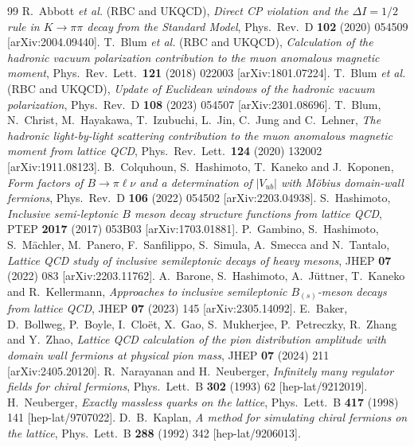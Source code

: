 \documentclass[11pt,a4paper]{article}
\numberwithin{equation}{section}
\begin{document}
\begin{thebibliography}{99}
 R.~Abbott \emph{et al.} (RBC and UKQCD), \emph{Direct CP violation and the $\Delta I=1/2$ rule in $K\to\pi\pi$ decay from the Standard Model}, Phys.\ Rev.\ D \textbf{102} (2020) 054509 [arXiv:2004.09440].
 T.~Blum \emph{et al.} (RBC and UKQCD), \emph{Calculation of the hadronic vacuum polarization contribution to the muon anomalous magnetic moment}, Phys.\ Rev.\ Lett.\ \textbf{121} (2018) 022003 [arXiv:1801.07224].
 T.~Blum \emph{et al.} (RBC and UKQCD), \emph{Update of Euclidean windows of the hadronic vacuum polarization}, Phys.\ Rev.\ D \textbf{108} (2023) 054507 [arXiv:2301.08696].
 T.~Blum, N.~Christ, M.~Hayakawa, T.~Izubuchi, L.~Jin, C.~Jung and C.~Lehner, \emph{The hadronic light-by-light scattering contribution to the muon anomalous magnetic moment from lattice QCD}, Phys.\ Rev.\ Lett.\ \textbf{124} (2020) 132002 [arXiv:1911.08123].
 B.~Colquhoun, S.~Hashimoto, T.~Kaneko and J.~Koponen, \emph{Form factors of $B\to\pi\ell\nu$ and a determination of $|V_{ub}|$ with M\"obius domain-wall fermions}, Phys.\ Rev.\ D \textbf{106} (2022) 054502 [arXiv:2203.04938].
 S.~Hashimoto, \emph{Inclusive semi-leptonic $B$ meson decay structure functions from lattice QCD}, PTEP \textbf{2017} (2017) 053B03 [arXiv:1703.01881].
 P.~Gambino, S.~Hashimoto, S.~M\"achler, M.~Panero, F.~Sanfilippo, S.~Simula, A.~Smecca and N.~Tantalo, \emph{Lattice QCD study of inclusive semileptonic decays of heavy mesons}, JHEP \textbf{07} (2022) 083 [arXiv:2203.11762].
 A.~Barone, S.~Hashimoto, A.~J\"uttner, T.~Kaneko and R.~Kellermann, \emph{Approaches to inclusive semileptonic $B_{(s)}$-meson decays from lattice QCD}, JHEP \textbf{07} (2023) 145 [arXiv:2305.14092].
 E.~Baker, D.~Bollweg, P.~Boyle, I.~Clo\"et, X.~Gao, S.~Mukherjee, P.~Petreczky, R.~Zhang and Y.~Zhao, \emph{Lattice QCD calculation of the pion distribution amplitude with domain wall fermions at physical pion mass}, JHEP \textbf{07} (2024) 211 [arXiv:2405.20120].
 R.~Narayanan and H.~Neuberger, \emph{Infinitely many regulator fields for chiral fermions},
Phys.\ Lett.\ B \textbf{302} (1993) 62 [hep-lat/9212019].
 H.~Neuberger, \emph{Exactly massless quarks on the lattice},
Phys.\ Lett.\ B \textbf{417} (1998) 141 [hep-lat/9707022].
 D.~B.~Kaplan, \emph{A method for simulating chiral fermions on the lattice},
Phys.\ Lett.\ B \textbf{288} (1992) 342 [hep-lat/9206013].

\end{thebibliography}
\end{document}
